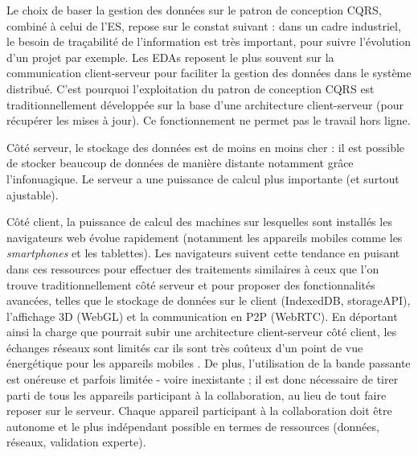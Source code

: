 %

Le choix de baser la gestion des données sur le patron de conception \gls{CQRS}, 
combiné à celui de l'\gls{ES}, repose sur le constat suivant : dans un cadre industriel, le 
besoin de traçabilité de l'information est très important, pour suivre l'évolution d'un 
projet par exemple. 
Les \glspl{EDA} reposent le plus souvent sur 
la communication client-serveur pour faciliter la gestion des données dans le 
système distribué. C'est pourquoi l'exploitation du patron de conception 
\gls{CQRS} est traditionnellement développée sur la base d'une architecture client-serveur (pour récupérer les mises à jour). 
Ce fonctionnement ne permet pas le travail hors ligne.

Côté serveur, le stockage des données est de moins en moins cher : il est possible de stocker beaucoup de données de manière distante notamment 
grâce l'infonuagique. Le serveur a une puissance de calcul 
plus importante (et surtout ajustable).

Côté client, la puissance de calcul des machines sur lesquelles sont installés les 
navigateurs web évolue rapidement (notamment les appareils mobiles comme les 
\textit{smartphones} et les tablettes). Les navigateurs suivent cette tendance en 
puisant dans ces ressources pour effectuer des traitements similaires à ceux que 
l'on trouve traditionnellement côté serveur et pour proposer des fonctionnalités 
avancées, telles que le stockage de données sur le client (IndexedDB, 
storageAPI), l'affichage \gls{3D} (WebGL) et la communication en 
\gls{P2P} 
(\gls{WebRTC}). En déportant ainsi la charge que pourrait subir une architecture 
client-serveur côté client, les échanges réseaux sont limités car ils 
sont très coûteux d'un point de vue énergétique pour les appareils mobiles 
\cite{Koskela2015}. De plus, l'utilisation de la bande passante est onéreuse et 
parfois limitée - voire inexistante ; il est donc nécessaire de tirer parti de tous les 
appareils participant à la collaboration, au lieu de tout faire reposer sur le serveur. 
Chaque appareil participant à la collaboration doit être autonome et le plus 
indépendant possible en termes de ressources (données, réseaux, validation 
experte). 

